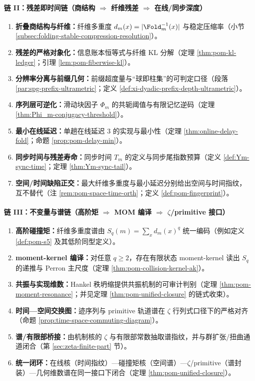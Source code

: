 \paragraph{链 II：残差即时间链（商结构 \texorpdfstring{$\Rightarrow$}{=>} 纤维残差 \texorpdfstring{$\Rightarrow$}{=>} 在线/同步深度）}
\begin{enumerate}
  \item \textbf{折叠商结构与纤维：}纤维多重度 \(d_m(x)=|\Fold_m^{-1}(x)|\) 与稳定压缩率（小节 \ref{subsec:folding-stable-compression-resolution}）。
  \item \textbf{残差的严格对象化：}信息账本恒等式与纤维 KL 分解（定理 \ref{thm:pom-kl-ledger}；引理 \ref{lem:pom-fiberwise-kl}）。
  \item \textbf{分辨率分离与前缀几何：}前缀超度量与“球即柱集”的可判定口径（段落 \ref{par:spg-prefix-ultrametric}；定义 \ref{def:xi-dyadic-prefix-depth-ultrametric}）。
  \item \textbf{序列层可逆化：}滑动块因子 \(\Phi_m\) 的共轭阈值与有限记忆逆码（定理 \ref{thm:Phi_m-conjugacy-threshold}）。
  \item \textbf{最小在线延迟：}单趟在线延迟 \(3\) 的实现与最小性（定理 \ref{thm:online-delay-fold}；命题 \ref{prop:pom-delay-min}）。
  \item \textbf{同步时间与残差寿命：}同步时间 \(T_m\) 的定义与同步尾指数预算（定义 \ref{def:Ym-sync-time}；定理 \ref{thm:Ym-sync-tail}）。
  \item \textbf{空间/时间缺陷正交：}最大纤维多重度与最小延迟分别给出空间与时间指纹，互不替代（注 \ref{rem:pom-space-time-orth}；定义 \ref{def:pom-fingerprint}）。
\end{enumerate}

\paragraph{链 III：不变量与谱链（高阶矩 \texorpdfstring{$\Rightarrow$}{=>} MOM 编译 \texorpdfstring{$\Rightarrow$}{=>} \texorpdfstring{$\zeta$}{zeta}/primitive 接口）}
\begin{enumerate}
  \item \textbf{高阶碰撞矩：}纤维多重度谱由 \(S_q(m)=\sum_x d_m(x)^q\) 统一编码（例如定义 \ref{def:pom-s5} 及其低阶同型定义）。
  \item \textbf{moment-kernel 编译：}对任意 \(q\ge 2\)，存在有限状态 moment-kernel 读出 \(S_q\) 的递推与 Perron 主尺度（定理 \ref{thm:pom-collision-kernel-ak}）。
  \item \textbf{共振与实现维数：}Hankel 秩坍缩提供共振机制的可审计判别（定理 \ref{thm:pom-moment-resonance}；并见定理 \ref{thm:pom-unified-closure} 的链式收束）。
  \item \textbf{时间—空间交换图：}迹序列与 primitive 轨道谱在 \(\zeta\) 行列式口径下的严格对齐（命题 \ref{prop:time-space-commuting-diagram}）。
  \item \textbf{谱/有限部桥接：}由机制核的 \(\zeta\) 与有限部常数抽取谱指纹，并与群扩张/扭曲通道闭合（第 \ref{sec:zeta-finite-part} 节）。
  \item \textbf{统一闭环：}在线核（时间指纹）—碰撞矩核（空间谱）—\(\zeta\)/primitive（谱封装）—几何维数谱在同一接口下闭合（定理 \ref{thm:pom-unified-closure}）。
\end{enumerate}
